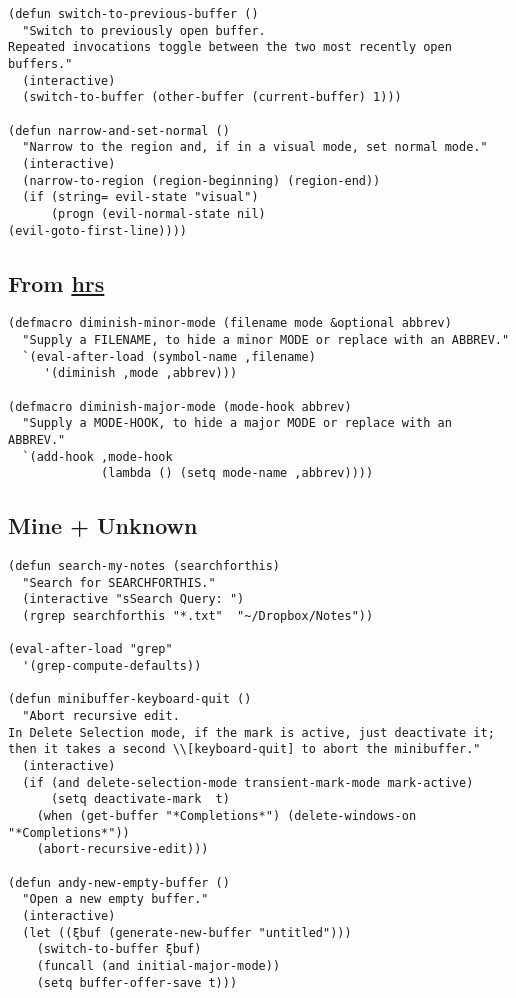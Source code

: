 \documentclass{article}
\begin{document}
\begin{verbatim}
(defun switch-to-previous-buffer ()
  "Switch to previously open buffer.
Repeated invocations toggle between the two most recently open buffers."
  (interactive)
  (switch-to-buffer (other-buffer (current-buffer) 1)))

(defun narrow-and-set-normal ()
  "Narrow to the region and, if in a visual mode, set normal mode."
  (interactive)
  (narrow-to-region (region-beginning) (region-end))
  (if (string= evil-state "visual")
      (progn (evil-normal-state nil)
(evil-goto-first-line))))
\end{verbatim}

\subsection{From \href{http://www.github.com/hrs}{hrs}}
\label{sec-5-2}

\begin{verbatim}
(defmacro diminish-minor-mode (filename mode &optional abbrev)
  "Supply a FILENAME, to hide a minor MODE or replace with an ABBREV."
  `(eval-after-load (symbol-name ,filename)
     '(diminish ,mode ,abbrev)))

(defmacro diminish-major-mode (mode-hook abbrev)
  "Supply a MODE-HOOK, to hide a major MODE or replace with an ABBREV."
  `(add-hook ,mode-hook
             (lambda () (setq mode-name ,abbrev))))
\end{verbatim}

\subsection{Mine + Unknown}
\label{sec-5-3}

\begin{verbatim}
(defun search-my-notes (searchforthis)
  "Search for SEARCHFORTHIS."
  (interactive "sSearch Query: ")
  (rgrep searchforthis "*.txt"  "~/Dropbox/Notes"))

(eval-after-load "grep"
  '(grep-compute-defaults))

(defun minibuffer-keyboard-quit ()
  "Abort recursive edit.
In Delete Selection mode, if the mark is active, just deactivate it;
then it takes a second \\[keyboard-quit] to abort the minibuffer."
  (interactive)
  (if (and delete-selection-mode transient-mark-mode mark-active)
      (setq deactivate-mark  t)
    (when (get-buffer "*Completions*") (delete-windows-on "*Completions*"))
    (abort-recursive-edit)))

(defun andy-new-empty-buffer ()
  "Open a new empty buffer."
  (interactive)
  (let ((ξbuf (generate-new-buffer "untitled")))
    (switch-to-buffer ξbuf)
    (funcall (and initial-major-mode))
    (setq buffer-offer-save t)))
\end{verbatim}
\end{document}
